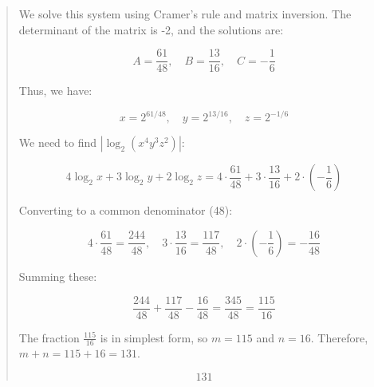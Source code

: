 {\begin{quote}
    We solve this system using Cramer's rule and matrix inversion. The determinant of the matrix is -2, and the solutions are:

    \[
    A = \frac{61}{48}, \quad B = \frac{13}{16}, \quad C = -\frac{1}{6}
    \]

    Thus, we have:

    \[
    x = 2^{61/48}, \quad y = 2^{13/16}, \quad z = 2^{-1/6}
    \]

    We need to find $\left|\log_2(x^4 y^3 z^2)\right|$:

    \[
    4 \log_2 x + 3 \log_2 y + 2 \log_2 z = 4 \cdot \frac{61}{48} + 3 \cdot \frac{13}{16} + 2 \cdot \left(-\frac{1}{6}\right)
    \]

    Converting to a common denominator (48):

    \[
    4 \cdot \frac{61}{48} = \frac{244}{48}, \quad 3 \cdot \frac{13}{16} = \frac{117}{48}, \quad 2 \cdot \left(-\frac{1}{6}\right) = -\frac{16}{48}
    \]

    Summing these:

    \[
    \frac{244}{48} + \frac{117}{48} - \frac{16}{48} = \frac{345}{48} = \frac{115}{16}
    \]

    The fraction $\frac{115}{16}$ is in simplest form, so $m = 115$ and $n = 16$. Therefore, $m + n = 115 + 16 = 131$.

    \[
    \boxed{131}
    \]
    \end{quote}
}





